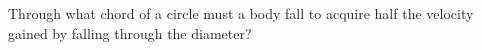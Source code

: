 Through what chord of a circle must a body fall
to acquire half the velocity gained by falling 
through the diameter?
